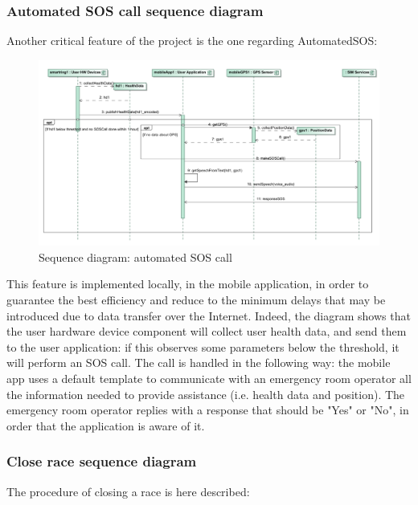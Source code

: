 \subsubsection{Automated SOS call sequence diagram}
Another critical feature of the project is the one regarding AutomatedSOS: 

\begin{figure}[H]
\includegraphics[width=\linewidth]{Images/automatedsos.pdf}
\caption{ Sequence diagram: automated SOS call}
\label{fig:automatedSOScall}
\end{figure}

This feature is implemented locally, in the mobile application, in order to guarantee the best efficiency and reduce to the minimum delays
that may be introduced due to data transfer over the Internet. 
Indeed, the diagram shows that the user hardware device component will collect user health data, and send them to the user application: if this observes some parameters below the threshold, it will perform an SOS call. 
The call is handled in the following way: the mobile app uses a default template to communicate with an emergency room operator all the
information needed to provide assistance (i.e. health data and position). 
The emergency room operator replies with a response that should be "Yes" or "No", in order that the application is aware of it.  \\

\subsubsection{Close race sequence diagram}
The procedure of closing a race is here described: 

